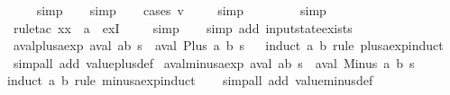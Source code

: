 \begin{isabellebody}
\ \ \ \isamarkupfalse%
\ simp\isanewline
\ \ \isamarkupfalse%
\ simp\isanewline
\ \ \isamarkupfalse%
\ {\isacharparenleft}cases\ v{\isacharparenright}\isanewline
\ \ \ \isamarkupfalse%
\ simp\isanewline
\ \ \ \isamarkupfalse%
\isanewline
\ \ \ \isamarkupfalse%
\ simp\isanewline
\ \ \ \isamarkupfalse%
\ {\isacharparenleft}rule{\isacharunderscore}tac\ x{\isacharequal}{\isachardoublequoteopen}{\isacharless}{\isachargreater}{\isacharparenleft}x{}\ {\isacharcolon}{\isacharequal}\ a{\isacharparenright}{\isachardoublequoteclose}\ \ exI{\isacharparenright}\isanewline
\ \ \ \isamarkupfalse%
\ simp\isanewline
\ \ \isamarkupfalse%
\ {\isacharparenleft}simp\ add{\isacharcolon}\ input{}state{\isacharunderscore}exists{\isacharparenright}%
\endisatagproof
{\isafoldproof}%
%
\isadelimproof
\isanewline
%
\endisadelimproof
\isanewline
{}\isamarkupfalse%
\ aval{\isacharunderscore}plus{\isacharunderscore}aexp{\isacharcolon}\ {\isachardoublequoteopen}aval\ {\isacharparenleft}a{\isacharplus}b{\isacharparenright}\ s\ {\isacharequal}\ aval\ {\isacharparenleft}Plus\ a\ b{\isacharparenright}\ s{\isachardoublequoteclose}\isanewline
%
\isadelimproof
\ \ %
\endisadelimproof
%
\isatagproof
{}\isamarkupfalse%
{\isacharparenleft}induct\ a\ b\ rule{\isacharcolon}\ plus{\isacharunderscore}aexp{\isachardot}induct{\isacharparenright}\isanewline
\ \ \isamarkupfalse%
\ {\isacharparenleft}simp{\isacharunderscore}all\ add{\isacharcolon}\ value{\isacharunderscore}plus{\isacharunderscore}def{\isacharparenright}%
\endisatagproof
{\isafoldproof}%
%
\isadelimproof
\isanewline
%
\endisadelimproof
\isanewline
{}\isamarkupfalse%
\ aval{\isacharunderscore}minus{\isacharunderscore}aexp{\isacharcolon}\ {\isachardoublequoteopen}aval\ {\isacharparenleft}a{\isacharminus}b{\isacharparenright}\ s\ {\isacharequal}\ aval\ {\isacharparenleft}Minus\ a\ b{\isacharparenright}\ s{\isachardoublequoteclose}\isanewline
%
\isadelimproof
\ \ %
\endisadelimproof
%
\isatagproof
{}\isamarkupfalse%
{\isacharparenleft}induct\ a\ b\ rule{\isacharcolon}\ minus{\isacharunderscore}aexp{\isachardot}induct{\isacharparenright}\isanewline
\ \ \isamarkupfalse%
\ {\isacharparenleft}simp{\isacharunderscore}all\ add{\isacharcolon}\ value{\isacharunderscore}minus{\isacharunderscore}def{\isacharparenright}%
\endisatagproof
{\isafoldproof}%
%
\isadelimproof

\end{isabellebody}
